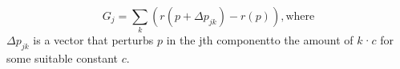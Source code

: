 \documentclass[12pt]{spieman}
\begin{document}
\begin{spacing}{2}
\begin{equation}
    G_{j} = \sum\limits_{k} (r(p+\Delta p_{jk})-r(p)),
    \text{where}
    \label{eq5}
\end{equation}
$\Delta p_{jk}$ is a vector that perturbs $p$ in the jth componentto the amount of $k$·$c$ for some suitable constant $c$.

\end{spacing}
\end{document}
